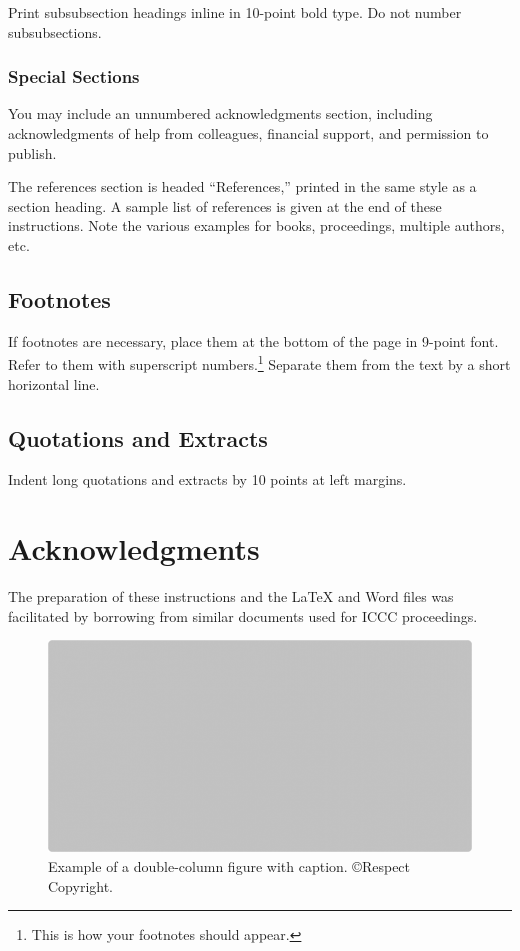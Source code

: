 \documentclass[letterpaper]{article}
\begin{document}
Print subsubsection headings inline in 10-point bold type. Do not number subsubsections.

\subsubsection{Special Sections}

You may include an unnumbered acknowledgments section, including acknowledgments of help from colleagues, financial support, and permission to publish.

The references section is headed ``References,'' printed in the same style as a section heading. A sample list of references is given at the end of these instructions.  Note the various examples for books, proceedings, multiple authors, etc. 

\subsection{Footnotes}

If footnotes are necessary, place them at the bottom of the page in 9-point font. Refer to them with superscript numbers.\footnote{This is how your footnotes should appear.} Separate them from the text by a short horizontal line. 

\subsection{Quotations and Extracts}
Indent long quotations and extracts by 10 points at left margins.

\section{Acknowledgments}
The preparation of these instructions and the \LaTeX{} and Word files was facilitated by borrowing from similar documents used for ICCC proceedings.

\begin{figure}
\includegraphics[width=\textwidth]{two-column-figure.png}
\caption{Example of a double-column figure with caption. \copyright Respect Copyright.}
\end{figure}
\end{document}

